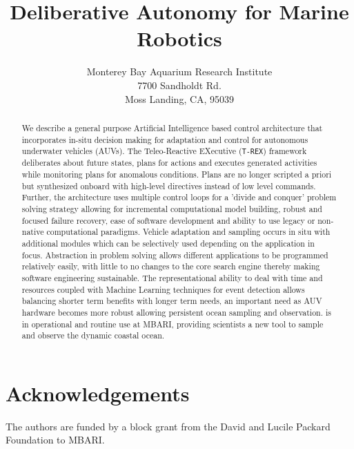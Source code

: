 \documentclass[12pt]{svmono}
\title{\textbf{\sc Deliberative Autonomy for Marine Robotics}}
\author{}
\date{\small Monterey Bay Aquarium Research Institute \\
7700 Sandholdt Rd.\\
Moss Landing,  CA, 95039\\
{\tt }}
\begin{document}
\maketitle

\begin{abstract}

  We describe a general purpose Artificial Intelligence based control
  architecture that incorporates in-situ decision making for
  adaptation and control for autonomous underwater vehicles
  (AUVs). The Teleo-Reactive EXecutive (\texttt{T-REX}) framework
  deliberates about future states, plans for actions and executes
  generated activities while monitoring plans for anomalous
  conditions. Plans are no longer scripted a priori but synthesized
  onboard with high-level directives instead of low level
  commands. Further, the architecture uses multiple control loops for
  a 'divide and conquer' problem solving strategy allowing for
  incremental computational model building, robust and focused failure
  recovery, ease of software development and ability to use legacy or
  non-native computational paradigms. Vehicle adaptation and sampling
  occurs in situ with additional modules which can be selectively used
  depending on the application in focus. Abstraction in problem
  solving allows different applications to be programmed relatively
  easily, with little to no changes to the core search engine thereby
  making software engineering sustainable. The representational
  ability to deal with time and resources coupled with Machine
  Learning techniques for event detection allows balancing shorter
  term benefits with longer term needs, an important need as AUV
  hardware becomes more robust allowing persistent ocean sampling and
  observation. \rx is in operational and routine use at MBARI,
  providing scientists a new tool to sample and observe the dynamic
  coastal ocean.
  

\end{abstract}















\section{Acknowledgements}

The authors are funded by a block grant from the David and Lucile
Packard Foundation to MBARI. 


\end{document}
